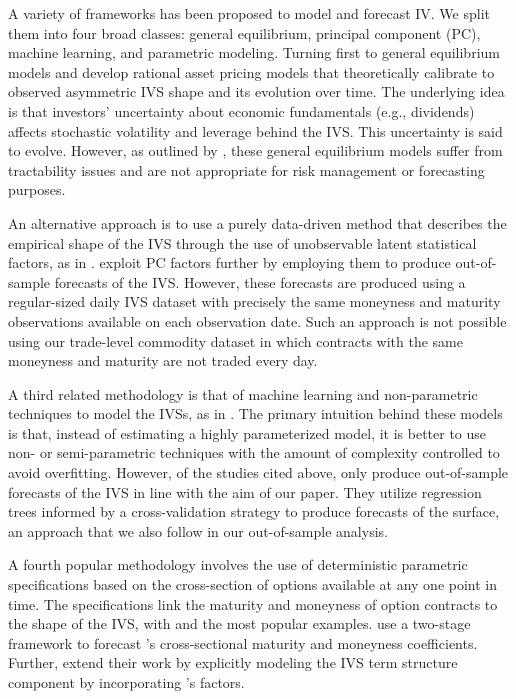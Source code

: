 \documentclass[12pt,a4paper]{article}
\newcommand\possessivecite[1]{\citeauthor{#1}'s \citeyearpar{#1}}
\begin{document}
A variety of frameworks has been proposed to model and forecast IV. We split them into four broad classes: general equilibrium, principal component (PC), machine learning, and parametric modeling. Turning first to general equilibrium models \cite{david2000option, guidolin2003option, garcia2003empirical, hibbert2008behavioral} and \cite{bernales2015learning} develop rational asset pricing models that theoretically calibrate to observed asymmetric IVS shape and its evolution over time. The underlying idea is that investors\textquoteright{} uncertainty about economic fundamentals (e.g., dividends) affects stochastic volatility and leverage behind the IVS. This uncertainty is said to evolve. However, as outlined by \cite{BH09}, these general equilibrium models suffer from tractability issues and are not appropriate for risk management or forecasting purposes.

An alternative approach is to use a purely data-driven method that describes the empirical shape of the IVS through the use of unobservable latent statistical factors, as in \cite{SHC00, alexander2001market,chalamandaris2010predictable}. \cite{chalamandaris2010predictable} exploit PC factors further by employing them to produce out-of-sample forecasts of the IVS. However, these forecasts are produced using a regular-sized daily IVS dataset with precisely the same moneyness and maturity observations available on each observation date. Such an approach is not possible using our trade-level commodity dataset in which contracts with the same moneyness and maturity are not traded every day.

A third related methodology is that of machine learning and non-parametric techniques to model the IVSs, as in \cite{CF02, FHV03, FHM07, AC10, FH15}. The primary intuition behind these models is that, instead of estimating a highly parameterized model, it is better to use non- or semi-parametric techniques with the amount of complexity controlled to avoid overfitting. However, of the studies cited above, only \cite{AC10} produce out-of-sample forecasts of the IVS in line with the aim of our paper. They utilize regression trees informed by a cross-validation strategy to produce forecasts of the surface, an approach that we also follow in our out-of-sample analysis.

A fourth popular methodology involves the use of deterministic parametric specifications based on the cross-section of options available at any one point in time. The specifications link the maturity and moneyness of option contracts to the shape of the IVS, with \cite{dumas1998implied} and \cite{pena1999we} the most popular examples. \cite{goncalves2006predictable} use a two-stage framework to forecast \possessivecite{dumas1998implied} cross-sectional maturity and moneyness coefficients. Further, \cite{chalamandaris2011important} extend their work by explicitly modeling the IVS term structure component by incorporating \possessivecite{nelson1987parsimonious} factors.
\end{document}
